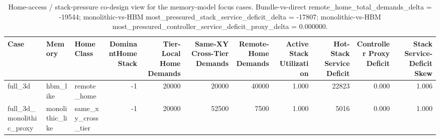 \begin{table}[t]
  \centering
  \caption{Home-access / stack-pressure co-design view for the memory-model focus cases. Bundle-vs-direct remote\_home\_total\_demands\_delta = -19544; monolithic-vs-HBM most\_pressured\_stack\_service\_deficit\_delta = -17807; monolithic-vs-HBM most\_pressured\_controller\_service\_deficit\_proxy\_delta = 0.000000.}
  \begin{tabular}{l l l r r r r r r r r}
  \hline
  Case & Memory & HomeClass & DominantHomeStack & Tier-Local Home Demands & Same-XY Cross-Tier Demands & Remote-Home Demands & Active Stack Utilization & Hot-Stack Service Deficit & Controller Proxy Deficit & Stack Service-Deficit Skew \\
  \hline
  full\_3d & hbm\_like & remote\_home & -1 & 20000 & 20000 & 40000 & 1.000 & 22823 & 0.000 & 1.006 \\
  full\_3d\_monolithic\_proxy & monolithic\_like & same\_xy\_cross\_tier & -1 & 20000 & 52500 & 7500 & 1.000 & 5016 & 0.000 & 1.000 \\
  \hline
  \end{tabular}
\end{table}

